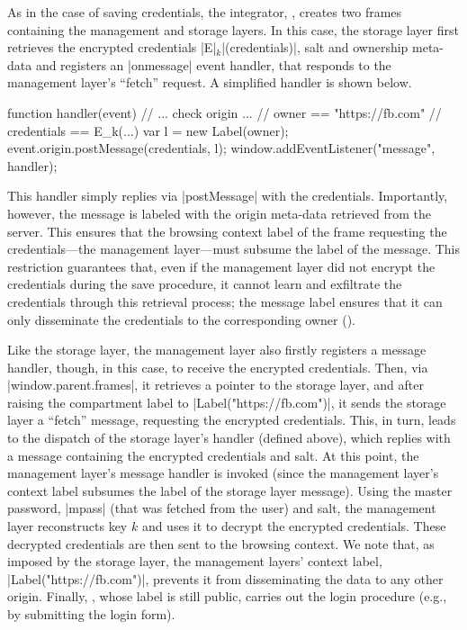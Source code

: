%
As in the case of saving credentials, the integrator, ,
creates two frames containing the management and storage layers.
%
In this case, the storage layer first retrieves the encrypted
credentials \js|E|$_k$\js|(credentials)|, salt and ownership meta-data
and registers an \js|onmessage| event handler, that responds to the
management layer's ``fetch'' request.  A simplified handler is shown
below.
\begin{jscode}
function handler(event) {
  // ... check origin ...
  // owner == "https://fb.com"
  // credentials == E_k(...)
  var l = new Label(owner);
  event.origin.postMessage(credentials, l);
} 
window.addEventListener("message", handler);
\end{jscode}
This handler simply replies via \js|postMessage| with the credentials.
%
Importantly, however, the message is labeled with the origin meta-data
retrieved from the server.
%
This ensures that the browsing context label of the frame requesting
the credentials---the management layer---must subsume the label of the
message. 
%
This restriction guarantees that, even if the management layer did not encrypt the
credentials during the save procedure, it cannot learn and
exfiltrate the credentials through this retrieval process; the message
label ensures that it can only disseminate the credentials to the
corresponding owner ().
%

Like the storage layer, the management layer also firstly registers a
message handler, though, in this case, to receive the encrypted
credentials. Then, via \js|window.parent.frames|, it retrieves a
pointer to the storage layer, and after raising the compartment label
to \js|Label("https://fb.com")|, it sends the storage layer a
``fetch'' message, requesting the encrypted credentials.
%
This, in turn, leads to the dispatch of the storage layer's handler
(defined above), which replies with a message containing the encrypted
credentials and salt.
%
At this point, the management layer's message handler is invoked
(since the management layer's context label subsumes the label of the
storage layer message).
%
Using the master password, \js|mpass| (that was fetched from the user)
and salt, the management layer reconstructs key $k$ and uses it to
decrypt the encrypted credentials.
%
These decrypted credentials are then sent to the 
browsing context.
%
We note that, as imposed by the storage layer, the management layers'
context label, \js|Label("https://fb.com")|, prevents it from
disseminating the data to any other origin.
%
Finally, , whose label is still public, carries out the
login procedure (e.g., by submitting the login form).

